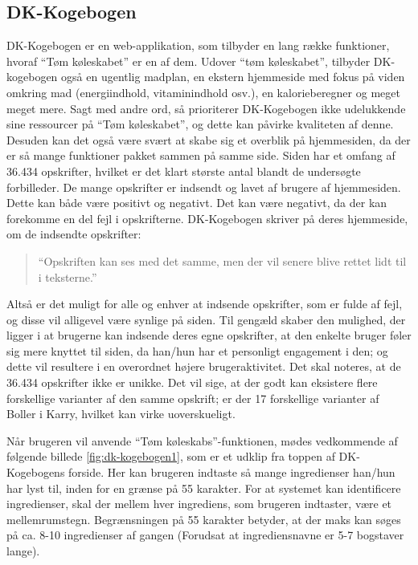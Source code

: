 \subsection{DK-Kogebogen}
\label{subsec:dk-kogebogen}

DK-Kogebogen er en web-applikation, som tilbyder en lang række funktioner, hvoraf ``Tøm køleskabet'' er en af dem. Udover ``tøm køleskabet'', tilbyder DK-kogebogen også en ugentlig madplan, en ekstern hjemmeside med fokus på viden omkring mad (energiindhold, vitaminindhold osv.), en kalorieberegner og meget meget mere. Sagt med andre ord, så prioriterer DK-Kogebogen ikke udelukkende sine ressourcer på ``Tøm køleskabet'', og dette kan påvirke kvaliteten af denne. Desuden kan det også være svært at skabe sig et overblik på hjemmesiden, da der er så mange funktioner pakket sammen på samme side. Siden har et omfang af 36.434 opskrifter, hvilket er det klart største antal blandt de undersøgte forbilleder. De mange opskrifter er indsendt og lavet af brugere af hjemmesiden. Dette kan både være positivt og negativt. Det kan være negativt, da der kan forekomme en del fejl i opskrifterne. DK-Kogebogen skriver på deres hjemmeside, om de indsendte opskrifter:

\begin{quote}
``Opskriften kan ses med det samme, men der vil senere blive rettet lidt til i teksterne.''
\end{quote}

Altså er det muligt for alle og enhver at indsende opskrifter, som er fulde af fejl, og disse vil alligevel være synlige på siden. Til gengæld skaber den mulighed, der ligger i at brugerne kan indsende deres egne opskrifter, at den enkelte bruger føler sig mere knyttet til siden, da han/hun har et personligt engagement i den; og dette vil resultere i en overordnet højere brugeraktivitet. Det skal noteres, at de 36.434 opskrifter ikke er unikke. Det vil sige, at der godt kan eksistere flere forskellige varianter af den samme opskrift; \fx er der 17 forskellige varianter af Boller i Karry, hvilket kan virke uoverskueligt.

Når brugeren vil anvende ``Tøm køleskabs''-funktionen, mødes vedkommende af følgende billede \ref{fig:dk-kogebogen1}, som er et udklip fra toppen af DK-Kogebogens forside. Her kan brugeren indtaste så mange ingredienser han/hun har lyst til, inden for en grænse på 55 karakter. For at systemet kan identificere ingredienser, skal der mellem hver ingrediens, som brugeren indtaster, være et mellemrumstegn. Begrænsningen på 55 karakter betyder, at der maks kan søges på ca. 8-10 ingredienser af gangen (Forudsat at ingrediensnavne er 5-7 bogstaver lange).

